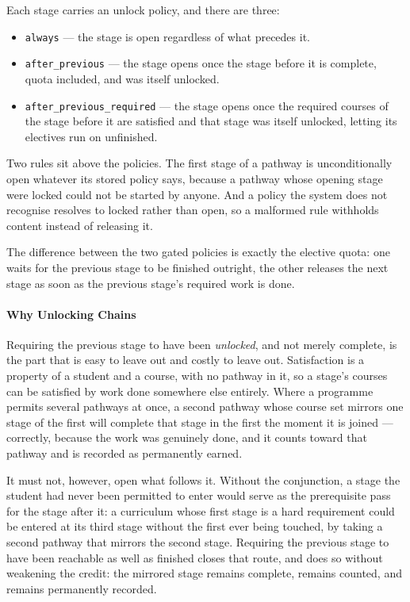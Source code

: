 Each stage carries an unlock policy, and there are three:

\begin{itemize}
  \item \texttt{always} --- the stage is open regardless of what precedes it.
  \item \texttt{after\_previous} --- the stage opens once the stage before it
        is complete, quota included, and was itself unlocked.
  \item \texttt{after\_previous\_required} --- the stage opens once the
        required courses of the stage before it are satisfied and that stage
        was itself unlocked, letting its electives run on unfinished.
\end{itemize}

Two rules sit above the policies. The first stage of a pathway is
unconditionally open whatever its stored policy says, because a pathway whose
opening stage were locked could not be started by anyone. And a policy the
system does not recognise resolves to locked rather than open, so a malformed
rule withholds content instead of releasing it.

The difference between the two gated policies is exactly the elective quota:
one waits for the previous stage to be finished outright, the other releases
the next stage as soon as the previous stage's required work is done.

\paragraph{Why Unlocking Chains}
Requiring the previous stage to have been \emph{unlocked}, and not merely complete, is the part that is easy to leave out and costly to leave out. Satisfaction is a property of a student and a course, with no pathway in it, so a stage's courses can be satisfied by work done somewhere else entirely. Where a programme permits several pathways at once, a second pathway whose course set mirrors one stage of the first will complete that stage in the first the moment it is joined --- correctly, because the work was genuinely done, and it counts toward that pathway and is recorded as permanently earned.

It must not, however, open what follows it. Without the conjunction, a stage the student had never been permitted to enter would serve as the prerequisite pass for the stage after it: a curriculum whose first stage is a hard requirement could be entered at its third stage without the first ever being touched, by taking a second pathway that mirrors the second stage. Requiring the previous stage to have been reachable as well as finished closes that route, and does so without weakening the credit: the mirrored stage remains complete, remains counted, and remains permanently recorded.


